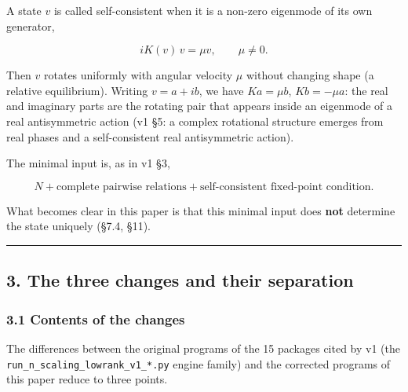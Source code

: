 \documentclass[
  10pt,
  a4paper,
]{article}
\begin{document}
A state \(v\) is called self-consistent when it is a non-zero eigenmode
of its own generator,

\[
iK(v)\,v=\mu v,\qquad \mu\neq0 .
\]

Then \(v\) rotates uniformly with angular velocity \(\mu\) without
changing shape (a relative equilibrium). Writing \(v=a+ib\), we have
\(Ka=\mu b\), \(Kb=-\mu a\): the real and imaginary parts are the
rotating pair that appears inside an eigenmode of a real antisymmetric
action (v1 §5: a complex rotational structure emerges from real phases
and a self-consistent real antisymmetric action).

The minimal input is, as in v1 §3,

\[
N+\text{complete pairwise relations}+\text{self-consistent fixed-point condition}.
\]

What becomes clear in this paper is that this minimal input does
\textbf{not} determine the state uniquely (§7.4, §11).

\begin{center}\rule{0.5\linewidth}{0.5pt}\end{center}

\subsection{3. The three changes and their
separation}\label{the-three-changes-and-their-separation}

\subsubsection{3.1 Contents of the
changes}\label{contents-of-the-changes}

The differences between the original programs of the 15 packages cited
by v1 (the \texttt{run\_n\_scaling\_lowrank\_v1\_*.py} engine family)
and the corrected programs of this paper reduce to three points.
\end{document}

